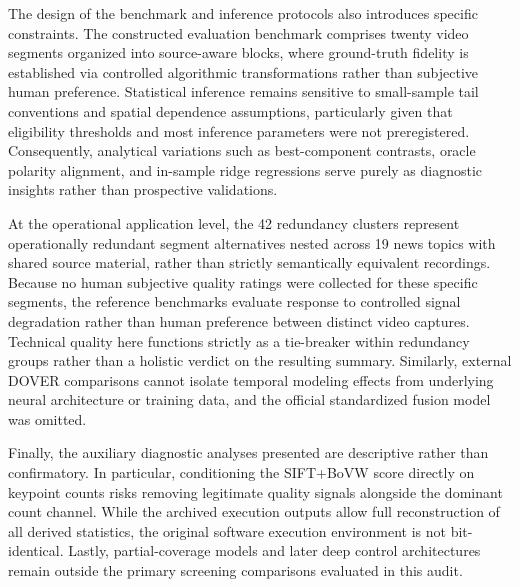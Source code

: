 The design of the benchmark and inference protocols also introduces specific constraints. The constructed evaluation benchmark comprises twenty video segments organized into \invBlocosN{} source-aware blocks, where ground-truth fidelity is established via controlled algorithmic transformations rather than subjective human preference. Statistical inference remains sensitive to small-sample tail conventions and spatial dependence assumptions, particularly given that eligibility thresholds and most inference parameters were not preregistered. Consequently, analytical variations such as best-component contrasts, oracle polarity alignment, and in-sample ridge regressions serve purely as diagnostic insights rather than prospective validations.

At the operational application level, the 42 redundancy clusters represent operationally redundant segment alternatives nested across 19 news topics with shared source material, rather than strictly semantically equivalent recordings. Because no human subjective quality ratings were collected for these specific segments, the reference benchmarks evaluate response to controlled signal degradation rather than human preference between distinct video captures. Technical quality here functions strictly as a tie-breaker within redundancy groups rather than a holistic verdict on the resulting summary. Similarly, external DOVER comparisons cannot isolate temporal modeling effects from underlying neural architecture or training data, and the official standardized fusion model was omitted.

Finally, the auxiliary diagnostic analyses presented are descriptive rather than confirmatory. In particular, conditioning the SIFT+BoVW score directly on keypoint counts risks removing legitimate quality signals alongside the dominant count channel. While the archived execution outputs allow full reconstruction of all derived statistics, the original software execution environment is not bit-identical. Lastly, partial-coverage models and later deep control architectures remain outside the primary screening comparisons evaluated in this audit.
